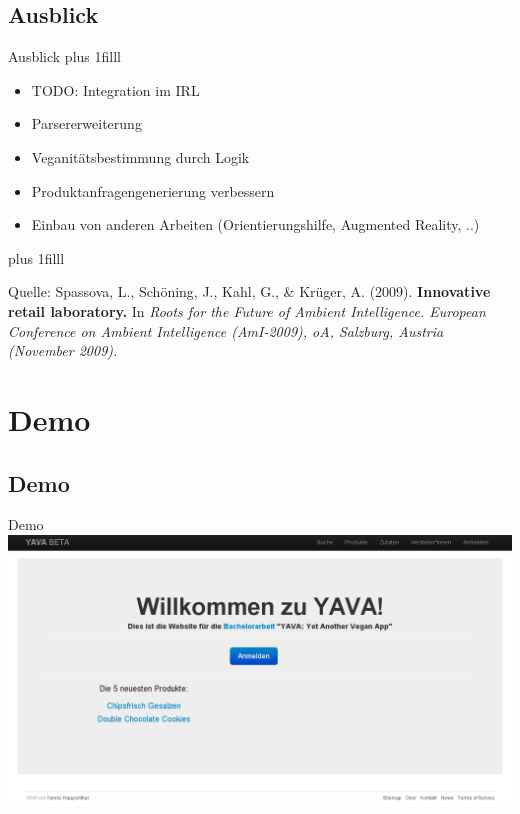 \documentclass{beamer}
\begin{document}
\subsection*{Ausblick}
\begin{frame}{Ausblick}
	\vskip0pt plus 1filll
	\begin{itemize}
			\item TODO: Integration im IRL
			\item Parsererweiterung
			\item Veganitätsbestimmung durch Logik
			\item Produktanfragengenerierung verbessern
			\item Einbau von anderen Arbeiten (Orientierungshilfe,
					Augmented Reality, ..)
	\end{itemize}
	\vskip0pt plus 1filll
	\par\hrulefill\par
	\tiny{Quelle:
	Spassova, L., Schöning, J., Kahl, G., \& Krüger, A. (2009).
	\textbf{Innovative retail laboratory.} In \textit{Roots for
	the Future of Ambient
    Intelligence. European Conference on Ambient Intelligence
	(AmI-2009), oA, Salzburg, Austria (November 2009).}}

\end{frame}

\section{Demo}
\subsection*{Demo}
\begin{frame}{Demo}
		\centering
		\includegraphics[scale=0.25]{pics/yava-demo.png}
\end{frame}
\end{document}

